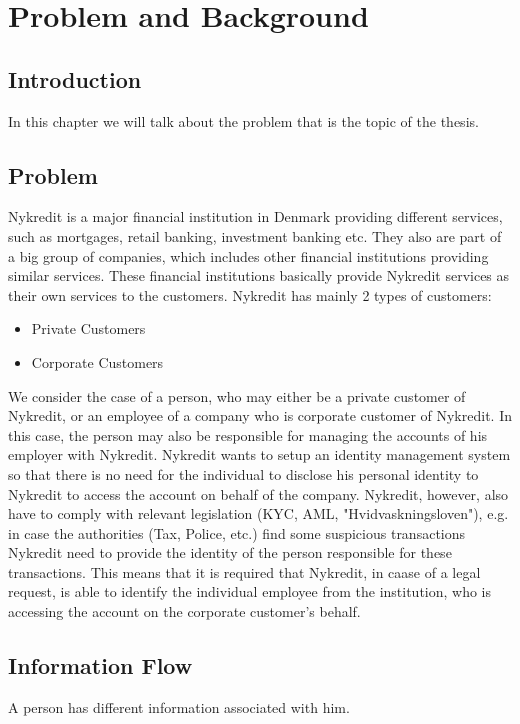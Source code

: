 \chapter{Problem and Background}

\section{Introduction}
In this chapter we will talk about the problem that is the topic of the thesis. 

\section{Problem}

Nykredit is a major financial institution in Denmark providing different services, such as mortgages, retail banking, investment banking etc. They also are part of a big group of companies, which includes other financial institutions providing similar services. These financial institutions basically provide Nykredit services as their own services to the customers.
Nykredit has mainly 2 types of customers:
\begin{itemize}
\item Private Customers
\item Corporate Customers
\end{itemize}

We consider the case of a person, who may either be a private customer of Nykredit, or an employee of a company who is corporate customer of Nykredit. In this case, the person may also be responsible for managing the accounts of his employer with Nykredit.
Nykredit wants to setup an identity management system so that there is no need for the individual to disclose his personal identity to Nykredit to access the account on behalf of the company.
Nykredit, however, also have to comply with relevant legislation (KYC, AML, "Hvidvaskningsloven"),  e.g. in case the authorities (Tax, Police, etc.) find some suspicious transactions Nykredit need to provide the identity of the person responsible for these transactions.
This means that it is required that Nykredit, in caase of a legal request, is able to identify the individual employee from the institution, who is accessing the account on the corporate customer's behalf.
\section{Information Flow}
A person has different information associated with him. 

